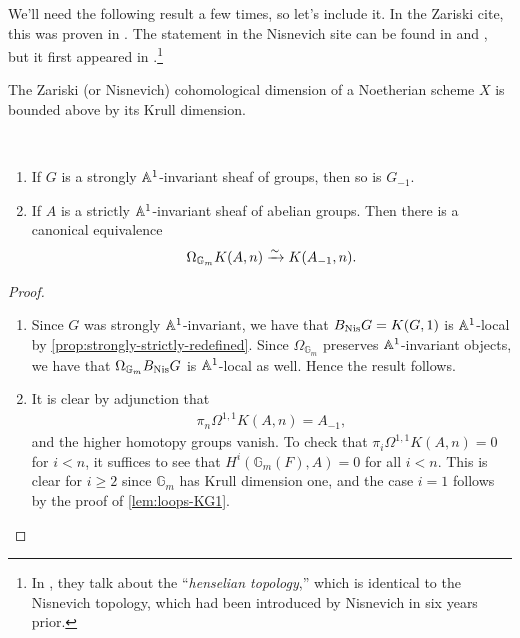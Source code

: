 \documentclass[11pt,openany]{book}
\begin{document}
We'll need the following result a few times, so let's include it. In the Zariski cite, this was proven in \cite[3.6.5]{Tohoku}. The statement in the Nisnevich site can be found in \cite[E.6(c)]{TT} and \cite[1.32]{Nisnevich-cd}, but it first appeared in \cite[1.2.5]{KS-Global}.\footnote{In \cite{KS-Global}, they talk about the ``\textit{henselian topology},'' which is identical to the Nisnevich topology, which had been introduced by Nisnevich in \cite{Nis80} six years prior.}

\begin{theorem}\label{thm:cd-krull-dim-inequality}
The Zariski (or Nisnevich) cohomological dimension of a Noetherian scheme $X$ is bounded above by its Krull dimension.
\end{theorem}


\begin{corollary}\label{cor:strongly-invt-contraction} \,
\begin{enumerate}
    \item If $G$ is a strongly $\mathbb{A}^1$-invariant sheaf of groups, then so is $G_{-1}$.
    \item If $A$ is a strictly $\mathbb{A}^1$-invariant sheaf of abelian groups. Then there is a canonical equivalence
    \begin{align*}
        \Omega_{\mathbb{G}_m} K(A,n) \xrightarrow{\sim} K(A_{-1},n).
    \end{align*}
\end{enumerate}
\end{corollary}
\begin{proof} $\ $
\begin{enumerate}
    \item Since $G$ was strongly $\mathbb{A}^1$-invariant, we have that $B_{\mathrm{Nis}} G = K(G,1)$ is $\mathbb{A}^1$-local by \autoref{prop:strongly-strictly-redefined}. Since $\Omega_{\mathbb{G}_m}$ preserves $\mathbb{A}^1$-invariant objects, we have that $\Omega_{\mathbb{G}_m}B_{\mathrm{Nis}} G$ is $\mathbb{A}^1$-local as well. Hence the result follows.
    \item It is clear by adjunction that
    \begin{align*}
        \pi_n \Omega^{1,1}K(A,n) = A_{-1},
    \end{align*}
    and the higher homotopy groups vanish. To check that $\pi_i \Omega^{1,1} K(A,n) = 0$ for $i<n$, it suffices to see that $H^i(\mathbb{G}_m(F), A) = 0$ for all $i<n$. This is clear for $i\ge 2$ since $\mathbb{G}_m$ has Krull dimension one, and the case $i=1$ follows by the proof of \autoref{lem:loops-KG1}.
\end{enumerate}
\end{proof}
\end{document}
